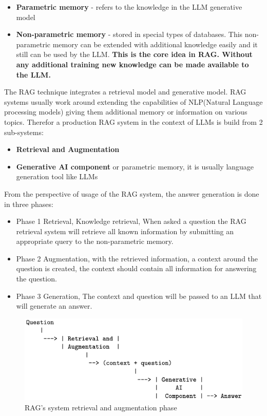 \documentclass{wseas}
\begin{document}
\begin{itemize}

\item
  \textbf{Parametric memory} - refers to the knowledge in the LLM
  generative model
\item
  \textbf{Non-parametric memory} - stored in special types of databases.
  This non-parametric memory can be extended with additional knowledge
  easily and it still can be used by the LLM. \textbf{This is the core
  idea in RAG. Without any additional training new knowledge can be made
  available to the LLM.}
\end{itemize}

The RAG technique integrates a retrieval model and generative model. RAG
systems usually work around extending the capabilities of NLP(Natural
Language processing models) giving them additional memory or information
on various topics. Therefor a production RAG system in the context of
LLMs is build from 2 sub-systems:

\begin{itemize}

\item
  \textbf{Retrieval and Augmentation}
\item
  \textbf{Generative AI component} or parametric memory, it is usually
  language generation tool like LLMs
\end{itemize}

From the perspective of usage of the RAG system, the answer generation is
done in three phases:

\begin{itemize}

\item
  Phase 1 Retrieval, Knowledge retrieval, When asked a question the RAG
  retrieval system will retrieve all known information by submitting an
  appropriate query to the non-parametric memory.
\item
  Phase 2 Augmentation, with the retrieved information, a context around
  the question is created, the context should contain all information
  for answering the question.
\item
  Phase 3 Generation, The context and question will be passed to an LLM
  that will generate an answer.
\end{itemize}



\begin{figure}[htbp]
  \centering
  \includegraphics[width=\linewidth]{resources/v1/retrievalAndAugmentation.png}
  \caption{RAG's system retrieval and augmentation phase}
  \label{fig:rag_system_figure}
\end{figure}
\end{document}
